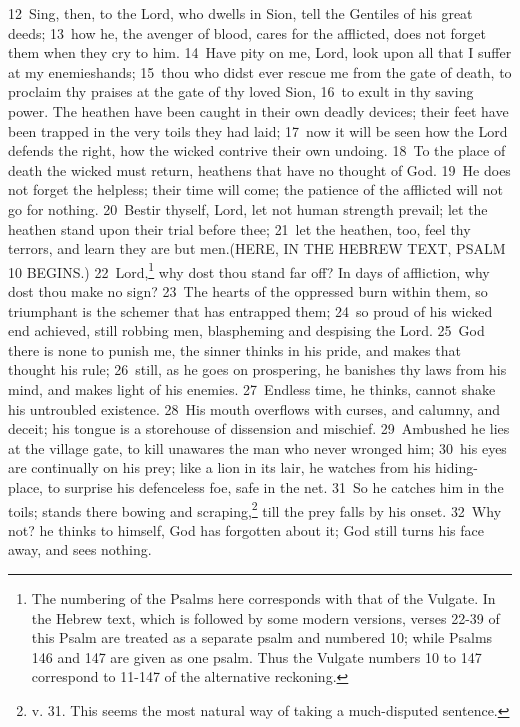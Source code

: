 \documentclass[10pt]{book} %
\begin{document}
\textcolor{benred8}{12}~Sing, then, to the Lord, who dwells in Sion, tell the Gentiles of his great deeds; \textcolor{benred8}{13}~how he, the avenger of blood, cares for the afflicted, does not forget them when they cry to him. \textcolor{benred8}{14}~Have pity on me, Lord, look upon all that I suffer at my enemies\textquotesingle  hands; \textcolor{benred8}{15}~thou who didst ever rescue me from the gate of death, to proclaim thy praises at the gate of thy loved Sion, \textcolor{benred8}{16}~to exult in thy saving power. The heathen have been caught in their own deadly devices; their feet have been trapped in the very toils they had laid; \textcolor{benred8}{17}~now it will be seen how the Lord defends the right, how the wicked contrive their own undoing. \textcolor{benred8}{18}~To the place of death the wicked must return, heathens that have no thought of God. \textcolor{benred8}{19}~He does not forget the helpless; their time will come; the patience of the afflicted will not go for nothing. \textcolor{benred8}{20}~Bestir thyself, Lord, let not human strength prevail; let the heathen stand upon their trial before thee; \textcolor{benred8}{21}~let the heathen, too, feel thy terrors, and learn they are but men.(HERE, IN THE HEBREW TEXT, PSALM 10 BEGINS.)
\textcolor{benred8}{22}~Lord,\footnote[1]{The numbering of the Psalms here corresponds with that of the Vulgate. In the Hebrew text, which is followed by some modern versions, verses 22-39 of this Psalm are treated as a separate psalm and numbered 10; while Psalms 146 and 147 are given as one psalm. Thus the Vulgate numbers 10 to 147 correspond to 11-147 of the alternative reckoning.} why dost thou stand far off? In days of affliction, why dost thou make no sign? \textcolor{benred8}{23}~The hearts of the oppressed burn within them, so triumphant is the schemer that has entrapped them; \textcolor{benred8}{24}~so proud of his wicked end achieved, still robbing men, blaspheming and despising the Lord. \textcolor{benred8}{25}~God there is none to punish me, the sinner thinks in his pride, and makes that thought his rule; \textcolor{benred8}{26}~still, as he goes on prospering, he banishes thy laws from his mind, and makes light of his enemies. \textcolor{benred8}{27}~Endless time, he thinks, cannot shake his untroubled existence. \textcolor{benred8}{28}~His mouth overflows with curses, and calumny, and deceit; his tongue is a storehouse of dissension and mischief. \textcolor{benred8}{29}~Ambushed he lies at the village gate, to kill unawares the man who never wronged him; \textcolor{benred8}{30}~his eyes are continually on his prey; like a lion in its lair, he watches from his hiding-place, to surprise his defenceless foe, safe in the net. \textcolor{benred8}{31}~So he catches him in the toils; stands there bowing and scraping,\footnote[2]{v. 31. This seems the most natural way of taking a much-disputed sentence.} till the prey falls by his onset. \textcolor{benred8}{32}~Why not? he thinks to himself, God has forgotten about it; God still turns his face away, and sees nothing.
\end{document}
